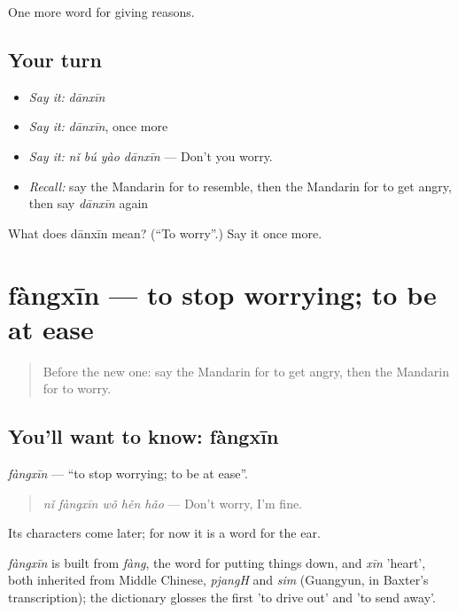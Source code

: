 \begin{grammarlens}[title={What you've built}]
One more word for giving reasons.
\end{grammarlens}

\subsection*{Your turn}
\begin{itemize}
\raggedright
  \item \emph{Say it:} \emph{dānxīn}
  \item \emph{Say it:} \emph{dānxīn}, once more
  \item \emph{Say it:} \emph{nǐ bú yào dānxīn} — Don't you worry.
  \item \emph{Recall:} say the Mandarin for to resemble, then the Mandarin for to get angry, then say \emph{dānxīn} again
\end{itemize}

\begin{tcolorbox}[breakable,colback=teal!4,colframe=teal!35!black,title={Before you move on}]
What does dānxīn mean? (\textquotedblleft{}To worry\textquotedblright{}.) Say it once more.
\end{tcolorbox}
\section[fàngxīn]{fàngxīn — to stop worrying; to be at ease}

\label{lesson:ZH-C125-fangxin}



\begin{quote}
Before the new one: say the Mandarin for to get angry, then the Mandarin for to worry.
\end{quote}

\subsection*{You'll want to know: fàngxīn}
\emph{fàngxīn} — \textquotedblleft{}to stop worrying; to be at ease\textquotedblright{}.

\begin{quote}
\emph{nǐ fàngxīn wǒ hěn hǎo} — Don't worry, I'm fine.
\end{quote}

Its characters come later; for now it is a word for the ear.

\begin{cousinweb}
\emph{fàngxīn} is built from \emph{fàng}, the word for putting things down, and \emph{xīn} 'heart', both inherited from Middle Chinese, \emph{pjangH} and \emph{sim} (Guangyun, in Baxter's transcription); the dictionary glosses the first 'to drive out' and 'to send away'.
\end{cousinweb}


